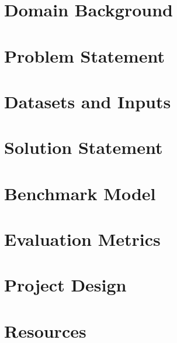 \documentclass[12pt, a4paper]{article}
\begin{document}
\begin{spacing}{1.1}
	\begin{titlepage}
		\vspace*{2cm}
		\renewcommand*\contentsname{Table of Contents}
		\tableofcontents
	\end{titlepage} \newpage

	\section{Domain Background}
	



	\section{Problem Statement}
	
	
	
	
	\section{Datasets and Inputs}
	
	
	
	
	\section{Solution Statement}
	
	
	
	
	\section{Benchmark Model}
	
	
	
	
	\section{Evaluation Metrics}
	
	
	
	
	\section{Project Design}
	
	


	\newpage
	\section{Resources}
	

\end{spacing}
\end{document}
